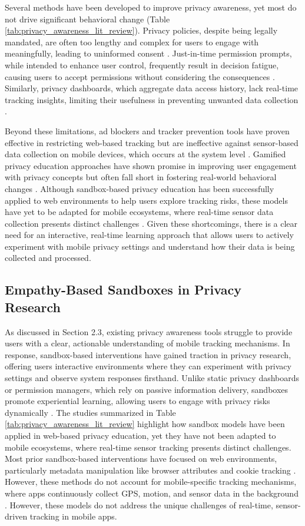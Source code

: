 \documentclass[acmlarge, nonacm]{acmart}
\begin{document}
Several methods have been developed to improve privacy awareness, yet most do not drive significant behavioral change (Table \ref{tab:privacy_awareness_lit_review}). Privacy policies, despite being legally mandated, are often too lengthy and complex for users to engage with meaningfully, leading to uninformed consent \cite{burkhardt2023privacy}. Just-in-time permission prompts, while intended to enhance user control, frequently result in decision fatigue, causing users to accept permissions without considering the consequences \cite{bilogrevic2021shhh}. Similarly, privacy dashboards, which aggregate data access history, lack real-time tracking insights, limiting their usefulness in preventing unwanted data collection \cite{narayanan2024real}.

Beyond these limitations, ad blockers and tracker prevention tools have proven effective in restricting web-based tracking but are ineffective against sensor-based data collection on mobile devices, which occurs at the system level \cite{bian2021supply}. Gamified privacy education approaches have shown promise in improving user engagement with privacy concepts but often fall short in fostering real-world behavioral changes \cite{idierukevbe2024bridging}. Although sandbox-based privacy education has been successfully applied to web environments to help users explore tracking risks, these models have yet to be adapted for mobile ecosystems, where real-time sensor data collection presents distinct challenges \cite{Chaoran2023EmpathySandbox}. Given these shortcomings, there is a clear need for an interactive, real-time learning approach that allows users to actively experiment with mobile privacy settings and understand how their data is being collected and processed.

\subsection{Empathy-Based Sandboxes in Privacy Research}
As discussed in Section 2.3, existing privacy awareness tools struggle to provide users with a clear, actionable understanding of mobile tracking mechanisms. In response, sandbox-based interventions have gained traction in privacy research, offering users interactive environments where they can experiment with privacy settings and observe system responses firsthand. Unlike static privacy dashboards or permission managers, which rely on passive information delivery, sandboxes promote experiential learning, allowing users to engage with privacy risks dynamically \cite{Chaoran2023EmpathySandbox}. The studies summarized in Table \ref{tab:privacy_awareness_lit_review} highlight how sandbox models have been applied in web-based privacy education, yet they have not been adapted to mobile ecosystems, where real-time sensor tracking presents distinct challenges. Most prior sandbox-based interventions have focused on web environments, particularly metadata manipulation like browser attributes and cookie tracking \cite{van2024we}. However, these methods do not account for mobile-specific tracking mechanisms, where apps continuously collect GPS, motion, and sensor data in the background \cite{bella}. However, these models do not address the unique challenges of real-time, sensor-driven tracking in mobile apps.
\end{document}
